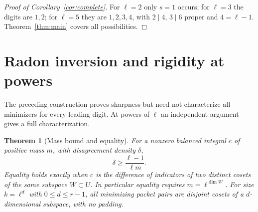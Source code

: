 \documentclass[11pt]{article}
\newtheorem{theorem}{Theorem}[section]
\theoremstyle{remark}\newtheorem{remark}[theorem]{Remark}
\begin{document}
\begin{proof}[Proof of Corollary~\ref{cor:complete}]
For $\ell=2$ only $s=1$ occurs; for $\ell=3$ the digits are $1,2$; for $\ell=5$ they are $1,2,3,4$, with $2\mid4$, $3\mid6$ proper and $4=\ell-1$. Theorem~\ref{thm:main} covers all possibilities.
\end{proof}

\section{Radon inversion and rigidity at powers}
The preceding construction proves sharpness but need not characterize all minimizers for every leading digit. At powers of $\ell$ an independent argument gives a full characterization.
\begin{theorem}[Mass bound and equality]\label{thm:rigid}
For a nonzero balanced integral $c$ of positive mass $m$, with disagreement density $\delta$,
\begin{equation}\label{eq:mass}
 \delta\ge\frac{\ell-1}{\ell m}.
\end{equation}
Equality holds exactly when $c$ is the difference of indicators of two distinct cosets of the same subspace $W\subset U$. In particular equality requires $m=\ell^{\dim W}$. For size $k=\ell^d$ with $0\le d\le r-1$, all minimizing packet pairs are disjoint cosets of a $d$-dimensional subspace, with no padding.
\end{theorem}
\end{document}
